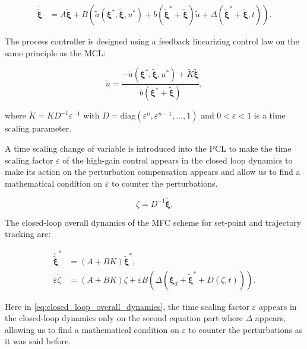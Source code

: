 \begin{align}
    \dot{\tilde{\boldsymbol{\xi}}} &= A\tilde{\boldsymbol{\xi}} + B\left(\tilde{a}(\boldsymbol{\xi}^*, \tilde{\boldsymbol{\xi}}, u^*) + b(\tilde{\boldsymbol{\xi}}^* + \tilde{\boldsymbol{\xi}}) \tilde{u} + \Delta(\tilde{\boldsymbol{\xi}}^* + \tilde{\boldsymbol{\xi}}, t) \right).
\end{align}

The process controller is designed using a feedback linearizing control law on the same principle as the MCL:

\begin{equation}
    \tilde{u} = \frac{-\tilde{a}(\boldsymbol{\xi}^*, \tilde{\boldsymbol{\xi}}, u^*) + \tilde{K}\tilde{\boldsymbol{\xi}}}{b(\boldsymbol{\xi}^* + \tilde{\boldsymbol{\xi}})},
\end{equation}

where \(\tilde{K} = KD^{-1}\varepsilon^{-1}\) with \(D = \text{diag}(\varepsilon^{n}, \varepsilon^{n-1}, 
\ldots, 1)\) and \(0 < \varepsilon < 1\) is a time scaling parameter.

A time scaling change of variable is introduced into the PCL to make the time scaling factor \(\varepsilon\)
of the high-gain control appears in the closed loop dynamics to make its action on the perturbation compensation
appears and allow us to find a mathematical condition on \(\varepsilon\) to counter the perturbations.

\begin{equation}
    \zeta = D^{-1}\tilde{\boldsymbol{\xi}}.
\end{equation}

The closed-loop overall dynamics of the MFC scheme for set-point and trajectory tracking are:

\begin{align}
    \label{eq:closed_loop_overall_dynamics}
    \dot{\tilde{\boldsymbol{\xi}}}^* &= (A + BK)\tilde{\boldsymbol{\xi}}^*, \\
    \varepsilon\dot{\zeta} &= (A + BK)\zeta + \varepsilon B \left(\Delta(\boldsymbol{\xi}_d + \tilde{\boldsymbol{\xi}}^* + D(\zeta, t)) \right).
\end{align}

Here in \ref{eq:closed_loop_overall_dynamics}, the time scaling factor \(\varepsilon\) appears in the
closed-loop dynamics only on the second equation part where \(\Delta\) appears, allowing us to find a
mathematical condition on \(\varepsilon\) to counter the perturbations as it was said before.

